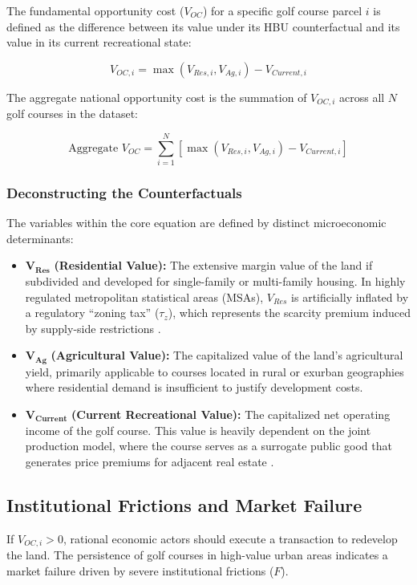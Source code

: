\documentclass[10pt, letterpaper]{article}
\begin{document}
The fundamental opportunity cost ($V_{OC}$) for a specific golf course parcel $i$ is defined as the difference between its value under its HBU counterfactual and its value in its current recreational state:

\begin{equation}
    V_{OC, i} = \max(V_{Res, i}, V_{Ag, i}) - V_{Current, i}
\end{equation}

The aggregate national opportunity cost is the summation of $V_{OC, i}$ across all $N$ golf courses in the dataset:

\begin{equation}
    \text{Aggregate } V_{OC} = \sum_{i=1}^{N} \left[ \max(V_{Res, i}, V_{Ag, i}) - V_{Current, i} \right]
\end{equation}

\subsubsection{Deconstructing the Counterfactuals}
The variables within the core equation are defined by distinct microeconomic determinants:

\begin{itemize}
    \item $\mathbf{V_{Res}}$ \textbf{(Residential Value):} The extensive margin value of the land if subdivided and developed for single-family or multi-family housing. In highly regulated metropolitan statistical areas (MSAs), $V_{Res}$ is artificially inflated by a regulatory ``zoning tax'' ($\tau_z$), which represents the scarcity premium induced by supply-side restrictions \parencite{Glaeser2005, Gyourko2021}.
    \item $\mathbf{V_{Ag}}$ \textbf{(Agricultural Value):} The capitalized value of the land's agricultural yield, primarily applicable to courses located in rural or exurban geographies where residential demand is insufficient to justify development costs.
    \item $\mathbf{V_{Current}}$ \textbf{(Current Recreational Value):} The capitalized net operating income of the golf course. This value is heavily dependent on the joint production model, where the course serves as a surrogate public good that generates price premiums for adjacent real estate \parencite{Limehouse2012}. 
\end{itemize}

\subsection{Institutional Frictions and Market Failure}
If $V_{OC, i} > 0$, rational economic actors should execute a transaction to redevelop the land. The persistence of golf courses in high-value urban areas indicates a market failure driven by severe institutional frictions ($F$). 
\end{document}
